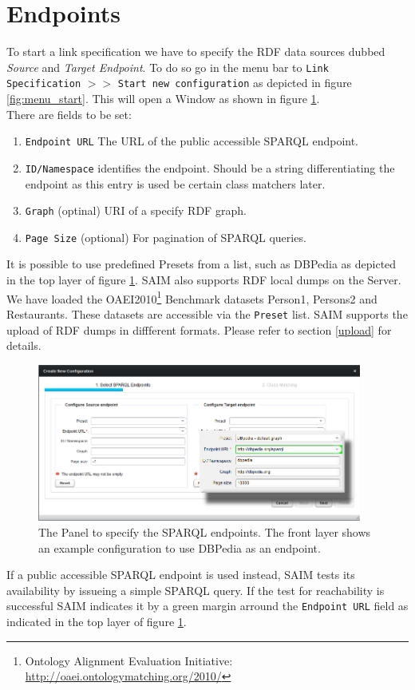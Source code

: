 \documentclass[oneside,a4paper,12pt]{memoir}
\begin{document}
	\section{Endpoints}
	\label{endpoint}
	To start a link specification we have to specify the RDF data sources dubbed \textit{Source} and \textit{Target Endpoint}. To do so go in the menu bar to \texttt{Link Specification} $>>$ \texttt{Start new configuration} as depicted in figure \ref{fig:menu_start}. This will open a Window as shown in figure \ref{fig:endpoint}. \\
	There are fields to be set:
	\begin{enumerate}
		\item \texttt{Endpoint URL} The URL of the public accessible SPARQL endpoint.
		\item \texttt{ID/Namespace} identifies the endpoint. Should be a string differentiating the endpoint as this entry is used be certain class matchers later.
		\item \texttt{Graph} (optinal) URI of a specify RDF graph.
		\item \texttt{Page Size} (optional) For pagination of SPARQL queries.
	\end{enumerate}
	It is possible to use predefined Presets from a list, such as DBPedia as depicted in the top layer of figure \ref{fig:endpoint}. SAIM also supports RDF local dumps on the Server. We have loaded the OAEI2010\footnote{Ontology Alignment Evaluation Initiative: \url{http://oaei.ontologymatching.org/2010/}} Benchmark datasets Person1, Persons2 and Restaurants. These datasets are accessible via the \texttt{Preset} list. SAIM supports the upload of RDF dumps in diffferent formats. Please refer to section \ref{upload} for details.\\
	\begin{figure}[!h]
		\centering
		\includegraphics[width=0.95\textwidth]{images/endpoint.png}
		\caption{The Panel to specify the SPARQL endpoints. The front layer shows an example configuration to use DBPedia as an endpoint.}
		\label{fig:endpoint}
	\end{figure}
If a public accessible SPARQL endpoint is used instead, SAIM tests its availability by issueing a simple SPARQL query. If the test for reachability is successful SAIM indicates it by a green margin arround the \texttt{Endpoint URL} field as indicated in the top layer of figure \ref{fig:endpoint}.
\end{document}
